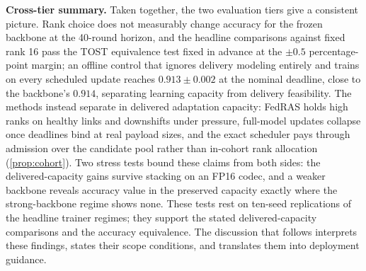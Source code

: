 \documentclass[a4paper,fleqn]{cas-dc}
\begin{document}
\par
\textbf{Cross-tier summary.} Taken together, the two evaluation tiers give a consistent picture. Rank choice does not measurably change accuracy for the frozen backbone at the 40-round horizon, and the headline comparisons against fixed rank 16 pass the TOST equivalence test fixed in advance at the $\pm0.5$ percentage-point margin; an offline control that ignores delivery modeling entirely and trains on every scheduled update reaches $0.913\pm0.002$ at the nominal deadline, close to the backbone's $0.914$, separating learning capacity from delivery feasibility. The methods instead separate in delivered adaptation capacity: FedRAS holds high ranks on healthy links and downshifts under pressure, full-model updates collapse once deadlines bind at real payload sizes, and the exact scheduler pays through admission over the candidate pool rather than in-cohort rank allocation (\cref{prop:cohort}). Two stress tests bound these claims from both sides: the delivered-capacity gains survive stacking on an FP16 codec, and a weaker backbone reveals accuracy value in the preserved capacity exactly where the strong-backbone regime shows none. These tests rest on ten-seed replications of the headline trainer regimes; they support the stated delivered-capacity comparisons and the accuracy equivalence. The discussion that follows interprets these findings, states their scope conditions, and translates them into deployment guidance.
\end{document}
